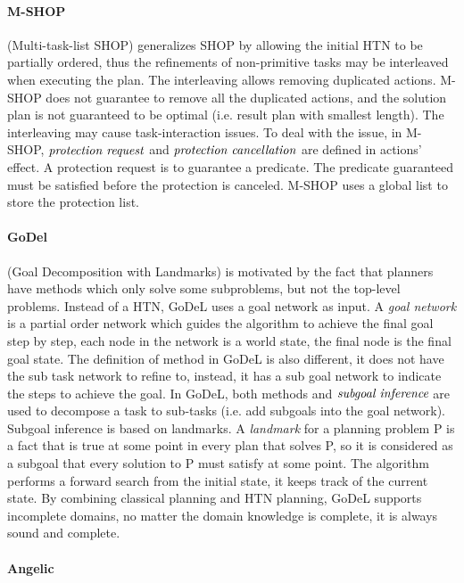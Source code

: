 \paragraph*{M-SHOP}

\cite{5} (Multi-task-list SHOP) generalizes SHOP by allowing the initial HTN to be partially ordered, thus the refinements of non-primitive tasks may be interleaved when executing the plan. The interleaving allows removing duplicated actions. M-SHOP does not guarantee to remove all the duplicated actions, and the solution plan is not guaranteed to be optimal (i.e. result plan with smallest length). The interleaving may cause task-interaction issues. To deal with the issue, in M-SHOP, $\emph{protection request}$ and $\emph{protection cancellation}$ are defined in actions’ effect. A protection request is to guarantee a predicate. The predicate guaranteed must be satisfied before the protection is canceled. M-SHOP uses a global list to store the protection list. 

\paragraph*{GoDel}

\cite{godel} (Goal Decomposition with Landmarks) is motivated by the fact that planners have methods which only solve some subproblems, but not the top-level problems. Instead of a HTN, GoDeL uses a goal network as input. A {\em goal network} is a partial order network which guides the algorithm to achieve the final goal step by step, each node in the network is a world state, the final node is the final goal state. The definition of method in GoDeL is also different, it does not have the sub task network to refine to, instead, it has a sub goal network to indicate the steps to achieve the goal. In GoDeL, both methods and $\emph{subgoal inference}$ are used to decompose a task to sub-tasks (i.e. add subgoals into the goal network). Subgoal inference is based on landmarks. A {\em landmark} for a planning problem P is a fact that is true at some point in every plan that solves P, so it is considered as a subgoal that every solution to P must satisfy at some point. The algorithm performs a forward search from the initial state, it keeps track of the current state. By combining classical planning and HTN planning, GoDeL supports incomplete domains, no matter the domain knowledge is complete, it is always sound and complete. 


\paragraph*{Angelic}

